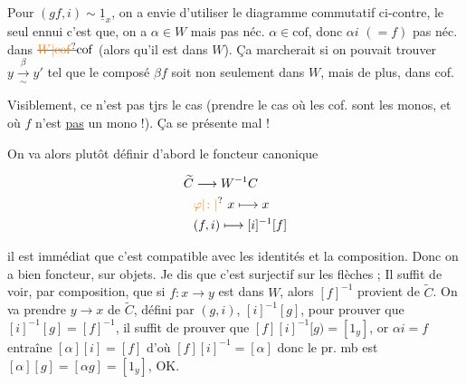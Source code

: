 
Pour $(gf,i)\sim\underline{1}_x$, on a envie d'utiliser le diagramme commutatif ci-contre, le seul ennui c'est que, on a $\alpha\in W$ mais pas néc. $\alpha\in\mathrm{cof}$, donc $\alpha i$ $(=f)$ pas néc. dans $\deleted{\unsure{W|\mathrm{cof}}}\mathrm{cof}$ (alors qu'il est dans $W$). Ça marcherait si on pouvait trouver $y\xrightarrow[\sim]{\beta}y'$  tel que le composé $\beta f$ soit non seulement dans $W$, mais de plus, dans cof.

Visiblement, ce n'est pas tjrs le cas (prendre le cas où les cof. sont les monos, et où $f$ n'est \uline{pas} un mono !). Ça se présente mal !


On va alors plutôt définir d'abord le foncteur canonique

\[
\begin{aligned}
 \widetilde C&\longrightarrow W^{-1}C\\
 &\unsure{\varphi|\colon|{}}\ x\longmapsto x\\
 &(f,i)\longmapsto [i]^{-1}[f]
\end{aligned}
\]

il est immédiat que c'est compatible avec les identités et la composition. Donc on a bien foncteur,   sur objets. Je dis que c'est surjectif sur les flèches ; Il suffit de voir, par composition, que si $f:x\longrightarrow y$ est dans $W$, alors $[f]^{-1}$ provient de $\widetilde C$. On va prendre  $y\longrightarrow x$ de $\widetilde C$, défini par $(g,i)$,   $[i]^{-1}[g]$, pour prouver que $[i]^{-1}[g]=[f]^{-1}$, il suffit de prouver que $[f][i]^{-1}[g)=[1_y]$, or $\alpha i=f$ entraîne $[\alpha][i]=[f]$ d'où $[f][i]^{-1}=[\alpha]$ donc le pr. mb est $[\alpha][g]=[\alpha g]=[1_y]$, OK.

